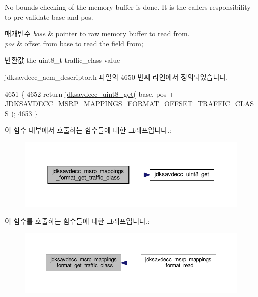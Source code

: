 No bounds checking of the memory buffer is done. It is the caller\textquotesingle{}s responsibility to pre-\/validate base and pos.


\begin{DoxyParams}{매개변수}
{\em base} & pointer to raw memory buffer to read from. \\
\hline
{\em pos} & offset from base to read the field from; \\
\hline
\end{DoxyParams}
\begin{DoxyReturn}{반환값}
the uint8\+\_\+t traffic\+\_\+class value 
\end{DoxyReturn}


jdksavdecc\+\_\+aem\+\_\+descriptor.\+h 파일의 4650 번째 라인에서 정의되었습니다.


\begin{DoxyCode}
4651 \{
4652     \textcolor{keywordflow}{return} \hyperlink{group__endian_ga27091e0bf32429d162f641a3f4bc933f}{jdksavdecc\_uint8\_get}( base, pos + 
      \hyperlink{group__msrp__mappings__format_gafb4f40fafbc97e1cbc3d37494fd7ccd9}{JDKSAVDECC\_MSRP\_MAPPINGS\_FORMAT\_OFFSET\_TRAFFIC\_CLASS} );
4653 \}
\end{DoxyCode}


이 함수 내부에서 호출하는 함수들에 대한 그래프입니다.\+:
\nopagebreak
\begin{figure}[H]
\begin{center}
\leavevmode
\includegraphics[width=350pt]{group__msrp__mappings__format_ga36383f5d5db3a07921dc2711eceebea9_cgraph}
\end{center}
\end{figure}




이 함수를 호출하는 함수들에 대한 그래프입니다.\+:
\nopagebreak
\begin{figure}[H]
\begin{center}
\leavevmode
\includegraphics[width=350pt]{group__msrp__mappings__format_ga36383f5d5db3a07921dc2711eceebea9_icgraph}
\end{center}
\end{figure}


